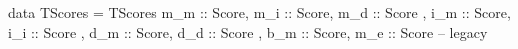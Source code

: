 data TScores = TScores
  { m_m :: Score, m_i :: Score, m_d :: Score
  , i_m :: Score, i_i :: Score
  , d_m :: Score, d_d :: Score
  , b_m :: Score, m_e :: Score } -- legacy
